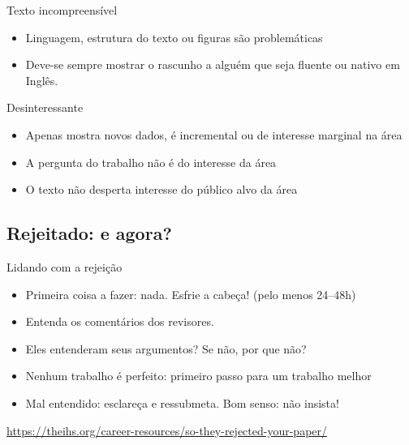 \documentclass{beamer}
\begin{document}
\begin{frame}{Texto incompreensível}
  \begin{itemize}
    \footnotesize
  \item Linguagem, estrutura do texto ou figuras são problemáticas
    \bigskip
  \item Deve-se sempre mostrar o rascunho a alguém que seja fluente ou
    nativo em Inglês.
  \end{itemize}
\end{frame}

\begin{frame}{Desinteressante}
  \begin{itemize}
    \footnotesize
  \item Apenas mostra novos dados, é incremental ou de interesse
    marginal na área
    \bigskip
  \item A pergunta do trabalho não é do interesse da área
    \bigskip
  \item O texto não desperta interesse do público alvo da área
  \end{itemize}
\end{frame}

\subsection{Rejeitado: e agora?}


\begin{frame}{Lidando com a rejeição}
  \begin{itemize}
    \footnotesize
  \item Primeira coisa a fazer: nada. Esfrie a cabeça! (pelo menos 24--48h)
    \medskip
  \item Entenda os comentários dos revisores.
    \medskip
  \item Eles entenderam seus argumentos? Se não, por que não?
    \medskip
  \item Nenhum trabalho é perfeito: primeiro passo para um trabalho
    melhor
    \medskip
  \item Mal entendido: esclareça e ressubmeta. Bom senso: não insista!
  \end{itemize}

  \vfill
  \tiny
  \hfill \url{https://theihs.org/career-resources/so-they-rejected-your-paper/}
\end{frame}
\end{document}
